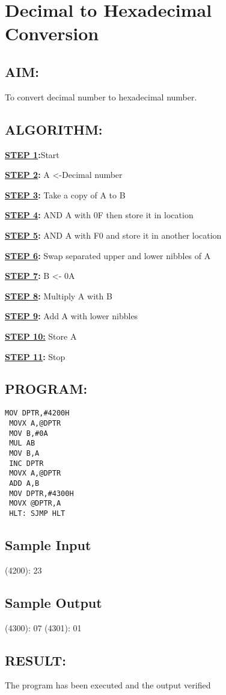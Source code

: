 \chapter{ Decimal to Hexadecimal Conversion}
%
%
%
%
\section*{AIM:}
To convert decimal number to hexadecimal number.

\section*{ALGORITHM:}
\textbf{\underline{STEP 1}:}Start

\textbf{\underline{STEP 2}:} A <-Decimal number

\textbf{\underline{STEP 3}:} Take a copy of A to B

\textbf{\underline{STEP 4}:} AND A with 0F then store it in location

\textbf{\underline{STEP 5}:} AND A with F0 and store it in another location

\textbf{\underline{STEP 6}:} Swap separated upper and lower nibbles of A

\textbf{\underline{STEP 7}:} B <- 0A

\textbf{\underline{STEP 8}:} Multiply A with B

\textbf{\underline{STEP 9}:} Add A with lower nibbles

\textbf{\underline{STEP 10:}} Store A

\textbf{\underline{STEP 11}:} Stop


\section*{PROGRAM:}

\begin{lstlisting}
MOV DPTR,#4200H 
 MOVX A,@DPTR  
 MOV B,#0A 
 MUL AB 
 MOV B,A 
 INC DPTR 
 MOVX A,@DPTR 
 ADD A,B 
 MOV DPTR,#4300H 
 MOVX @DPTR,A 
 HLT: SJMP HLT
\end{lstlisting}

\section*{Sample Input}
(4200): 23 

\section*{Sample Output}
(4300): 07 
(4301): 01 

\section*{RESULT:}
The program has been executed and the output verified
%
%
%
%
